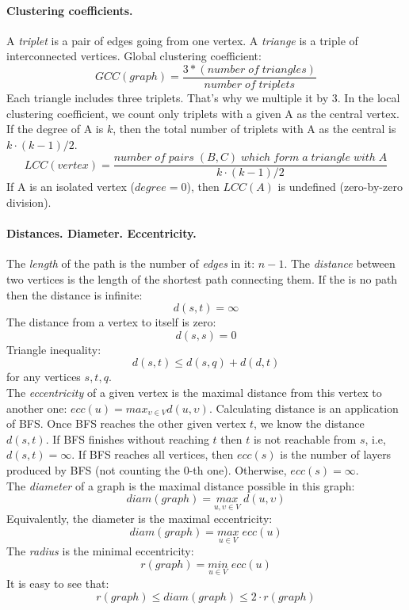 \documentclass{article}
\begin{document}
\paragraph{Clustering coefficients.}
A {\it triplet} is a pair of edges going from one vertex. A {\it triange} is a triple of interconnected vertices. Global clustering coefficient:
\[
GCC(graph) = \frac{3 * (number \; of \;triangles)}{number \; of \; triplets}
\]
Each triangle includes three triplets. That's why we multiple it by 3.
In the local clustering coefficient, we count only triplets with a given A as the central vertex. If the degree of A is $k$, then the total number of triplets with A as the central is $k \cdot (k-1)/2$.
\[
LCC(vertex) = \frac{number \; of \; pairs \; (B,C) \; which \; form \; a \; triangle \; with \; A}{k \cdot (k-1)/2}
\]
If A is an isolated vertex ($degree = 0$), then $LCC(A)$ is undefined (zero-by-zero division).

\paragraph{Distances. Diameter. Eccentricity.}
The {\it length} of the path is the number of {\it edges} in it: $n-1$. The {\it distance} between two vertices is the length of the shortest path connecting them. If the is no path then the distance is infinite:
\[
d(s,t) = \infty
\]
The distance from a vertex to itself is zero:
\[
d(s,s) = 0
\]
{Triangle inequality:}
\[
d(s,t) \leq d(s,q) + d(d,t)
\]
for any vertices $s, t, q$.
\\
The {\it eccentricity} of a given vertex is the maximal distance from this vertex to another one: $ecc(u) = max_{\upsilon \in V}d(u, \upsilon)$. Calculating distance is an application of BFS. Once BFS reaches the other given vertex $t$, we know the distance $d(s,t)$. If BFS finishes without reaching $t$ then $t$ is not reachable from $s$, i.e, $d(s,t) = \infty$. If BFS reaches all vertices, then $ecc(s)$ is the number of layers produced by BFS (not counting the 0-th one). Otherwise, $ecc(s) = \infty$.
\\
The {\it diameter} of a graph is the maximal distance possible in this graph:
\[
diam(graph) = \underset{u, \upsilon \in V}{max} \; d(u,\upsilon)
\]
Equivalently, the diameter is the maximal eccentricity:
\[
diam(graph) = \underset{u\in V}{max} \; ecc(u)
\]
The {\it radius} is the minimal eccentricity:
\[
r(graph) = \underset{u\in V}{min} \; ecc(u)
\]
It is easy to see that:
\[
r(graph) \leq diam(graph) \leq 2 \cdot r(graph)
\]
\end{document}
